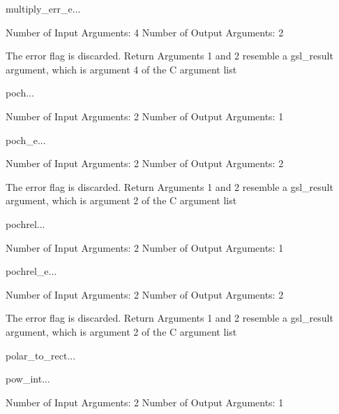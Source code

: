 \begin{funcdesc}{multiply_err_e}{...}

    Number of Input  Arguments:  4
    Number of Output Arguments:  2

The error flag is discarded.
Return Arguments 1 and 2 resemble a gsl_result argument,
	which is  argument 4 of the C argument list

\end{funcdesc}

\begin{funcdesc}{poch}{...}

    Number of Input  Arguments:  2
    Number of Output Arguments:  1
\end{funcdesc}

\begin{funcdesc}{poch_e}{...}

    Number of Input  Arguments:  2
    Number of Output Arguments:  2

The error flag is discarded.
Return Arguments 1 and 2 resemble a gsl_result argument,
	which is  argument 2 of the C argument list

\end{funcdesc}

\begin{funcdesc}{pochrel}{...}

    Number of Input  Arguments:  2
    Number of Output Arguments:  1
\end{funcdesc}

\begin{funcdesc}{pochrel_e}{...}

    Number of Input  Arguments:  2
    Number of Output Arguments:  2

The error flag is discarded.
Return Arguments 1 and 2 resemble a gsl_result argument,
	which is  argument 2 of the C argument list

\end{funcdesc}

\begin{funcdesc}{polar_to_rect}{...}

\end{funcdesc}

\begin{funcdesc}{pow_int}{...}

    Number of Input  Arguments:  2
    Number of Output Arguments:  1
\end{funcdesc}

